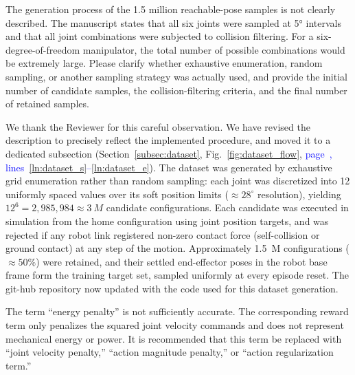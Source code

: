\documentclass[11pt]{elsarticle}
\newcommand{\mlines}[2]{\textcolor{blue}{page~\pageref{#1}, lines~\ref{#1}--\ref{#2}}}
\begin{document}
\begin{reviewerbox}[Comment R1.3]
The generation process of the 1.5 million reachable-pose samples is not clearly described. The manuscript states that all six joints were sampled at 5° intervals and that all joint combinations were subjected to collision filtering. For a six-degree-of-freedom manipulator, the total number of possible combinations would be extremely large. Please clarify whether exhaustive enumeration, random sampling, or another sampling strategy was actually used, and provide the initial number of candidate samples, the collision-filtering criteria, and the final number of retained samples.
\end{reviewerbox}

\begin{responsebox}
We thank the Reviewer for this careful observation. We have revised the description to precisely reflect the implemented procedure, and moved it to a dedicated subsection (Section~\ref{subsec:dataset}, Fig.~\ref{fig:dataset_flow}, \mlines{ln:dataset_s}{ln:dataset_e}). The dataset was generated by exhaustive grid enumeration rather than random sampling: each joint was discretized into 12 uniformly spaced values over its soft position limits (${\approx}28^{\circ}$ resolution), yielding $12^{6} = 2{,}985{,}984 \approx 3~M$ candidate configurations. Each candidate was executed in simulation from the home configuration using joint position targets, and was rejected if any robot link registered non-zero contact force (self-collision or ground contact) at any step of the motion. Approximately 1.5~M configurations (${\approx}50\%$) were retained, and their settled end-effector poses in the robot base frame form the training target set, sampled uniformly at every episode reset. The git-hub repository now updated with the code used for this dataset generation.
\end{responsebox}

\begin{reviewerbox}[Comment R1.4]
The term ``energy penalty'' is not sufficiently accurate. The corresponding reward term only penalizes the squared joint velocity commands and does not represent mechanical energy or power. It is recommended that this term be replaced with ``joint velocity penalty,'' ``action magnitude penalty,'' or ``action regularization term.''
\end{reviewerbox}
\end{document}
